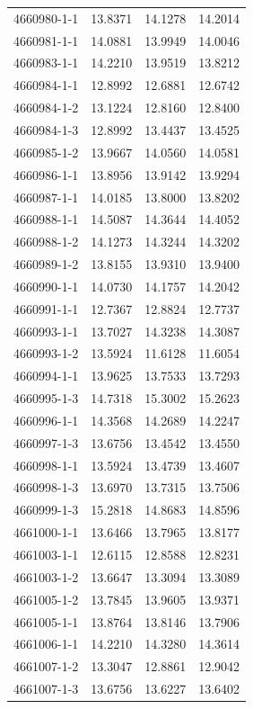 \begin{longtable}{lrrr}
4660980-1-1 & 13.8371 & 14.1278 & 14.2014 \\
4660981-1-1 & 14.0881 & 13.9949 & 14.0046 \\
4660983-1-1 & 14.2210 & 13.9519 & 13.8212 \\
4660984-1-1 & 12.8992 & 12.6881 & 12.6742 \\
4660984-1-2 & 13.1224 & 12.8160 & 12.8400 \\
4660984-1-3 & 12.8992 & 13.4437 & 13.4525 \\
4660985-1-2 & 13.9667 & 14.0560 & 14.0581 \\
4660986-1-1 & 13.8956 & 13.9142 & 13.9294 \\
4660987-1-1 & 14.0185 & 13.8000 & 13.8202 \\
4660988-1-1 & 14.5087 & 14.3644 & 14.4052 \\
4660988-1-2 & 14.1273 & 14.3244 & 14.3202 \\
4660989-1-2 & 13.8155 & 13.9310 & 13.9400 \\
4660990-1-1 & 14.0730 & 14.1757 & 14.2042 \\
4660991-1-1 & 12.7367 & 12.8824 & 12.7737 \\
4660993-1-1 & 13.7027 & 14.3238 & 14.3087 \\
4660993-1-2 & 13.5924 & 11.6128 & 11.6054 \\
4660994-1-1 & 13.9625 & 13.7533 & 13.7293 \\
4660995-1-3 & 14.7318 & 15.3002 & 15.2623 \\
4660996-1-1 & 14.3568 & 14.2689 & 14.2247 \\
4660997-1-3 & 13.6756 & 13.4542 & 13.4550 \\
4660998-1-1 & 13.5924 & 13.4739 & 13.4607 \\
4660998-1-3 & 13.6970 & 13.7315 & 13.7506 \\
4660999-1-3 & 15.2818 & 14.8683 & 14.8596 \\
4661000-1-1 & 13.6466 & 13.7965 & 13.8177 \\
4661003-1-1 & 12.6115 & 12.8588 & 12.8231 \\
4661003-1-2 & 13.6647 & 13.3094 & 13.3089 \\
4661005-1-2 & 13.7845 & 13.9605 & 13.9371 \\
4661005-1-1 & 13.8764 & 13.8146 & 13.7906 \\
4661006-1-1 & 14.2210 & 14.3280 & 14.3614 \\
4661007-1-2 & 13.3047 & 12.8861 & 12.9042 \\
4661007-1-3 & 13.6756 & 13.6227 & 13.6402 \\

\end{longtable}
